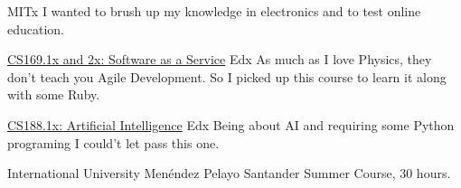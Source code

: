 \documentclass[11pt,a4paper,roman]{moderncv}
\begin{document}
	{MITx}
	{}
	{}
	{I wanted to brush up my knowledge in electronics and to test online education.} 

	{\href{https://www.edx.org/courses/BerkeleyX/CS169.1x/2013_Spring/about}
	{CS169.1x and 2x: Software as a Service}}
	{Edx}
	{}
	{}
	{As much as I love Physics, they don't teach you Agile Development. So I picked up this course to learn it along with some Ruby.} 

	{\href{https://6002x.mitx.mit.edu/}
	{CS188.1x: Artificial Intelligence}}
	{Edx}
	{}
	{}
	{Being about AI and requiring some Python programing I could't let pass this one.} 



	{International University Men\'endez Pelayo}
	{Santander}
	{}
	{Summer Course, 30 hours.}



\end{document}
